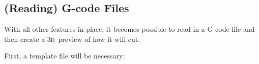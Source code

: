 \documentclass{ltxdoc}
\begin{document}
 
\subsection{(Reading) G-code Files}

With all other features in place, it becomes possible to read in a G-code file and then create a \textsc{3d}~preview of how it will cut. 

First, a template file will be necessary:
\end{document}
